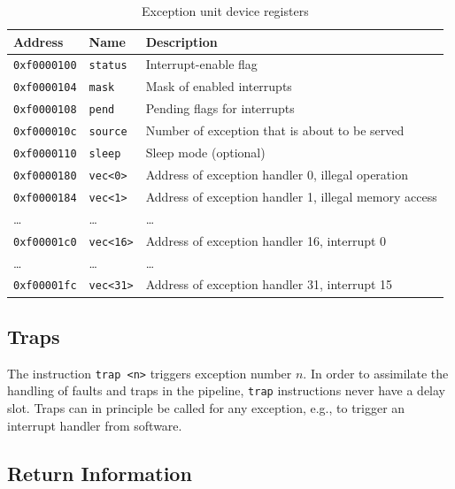 \documentclass[a4paper,fontsize=10pt,twoside,DIV15,BCOR12mm,headinclude=true,footinclude=false,pagesize,bibtotoc]{scrbook}
\begin{document}
\begin{table}[b]
  \centering
  \begin{tabular}{llp{}}
    \toprule
    Address             & Name             & Description \\
    \midrule
    \texttt{0xf0000100} & \texttt{status} & Interrupt-enable flag \\
    \texttt{0xf0000104} & \texttt{mask} & Mask of enabled interrupts \\
    \texttt{0xf0000108} & \texttt{pend} & Pending flags for interrupts \\
    \texttt{0xf000010c} & \texttt{source} & Number of exception that
    is about to be served \\
    \texttt{0xf0000110} & \texttt{sleep} & Sleep mode (optional) \\
    \cmidrule{1-3}
    \texttt{0xf0000180} & \texttt{vec<0>} & Address of exception handler 0, illegal operation \\
    \texttt{0xf0000184} & \texttt{vec<1>} & Address of exception handler 1, illegal memory access \\
    \ldots & \ldots & \ldots \\
    \cmidrule{1-3}
    \texttt{0xf00001c0} & \texttt{vec<16>} & Address of exception handler 16, interrupt 0 \\
    \ldots & \ldots & \ldots \\
    \texttt{0xf00001fc} & \texttt{vec<31>} & Address of exception handler 31, interrupt 15 \\
    \bottomrule
  \end{tabular}
  \caption{Exception unit device registers}
  \label{tab:excioregs}
\end{table}

\subsection{Traps}

The instruction \texttt{trap <n>} triggers exception number $n$. In
order to assimilate the handling of faults and traps in the pipeline,
\texttt{trap} instructions never have a delay slot. Traps can in
principle be called for any exception, e.g., to trigger an interrupt
handler from software.

\subsection{Return Information}
\end{document}
